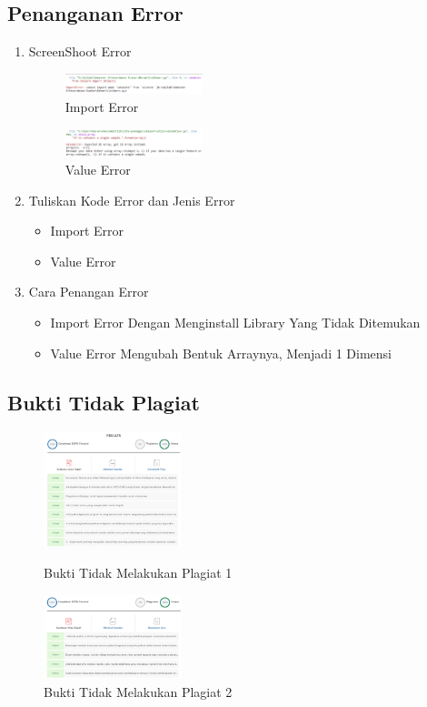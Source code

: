 \subsection{Penanganan Error}
\begin{enumerate}
	\item ScreenShoot Error
	\begin{figure}[H]
		\includegraphics[width=4cm]{figures/1174031/1/error/1.png}
		\centering
		\caption{Import Error}
	\end{figure}
	\begin{figure}[H]
		\includegraphics[width=4cm]{figures/1174031/1/error/2.png}
		\centering
		\caption{Value Error}
	\end{figure}
	\item Tuliskan Kode Error dan Jenis Error
	\begin{itemize}
		\item Import Error
		\item Value Error
	\end{itemize}
	\item Cara Penangan Error
	\begin{itemize}
		\item Import Error
		\hfill\break
		Dengan Menginstall Library Yang Tidak Ditemukan
		\item Value Error
		\hfill\break
		Mengubah Bentuk Arraynya, Menjadi 1 Dimensi
	\end{itemize}
\end{enumerate}
\subsection{Bukti Tidak Plagiat}
\begin{figure}[H]
	\includegraphics[width=4cm]{figures/1174031/1/plagiat/1.png}
	\centering
	\caption{Bukti Tidak Melakukan Plagiat 1}
    \includegraphics[width=4cm]{figures/1174031/1/plagiat/2.png}
	\centering
	\caption{Bukti Tidak Melakukan Plagiat 2}
\end{figure}